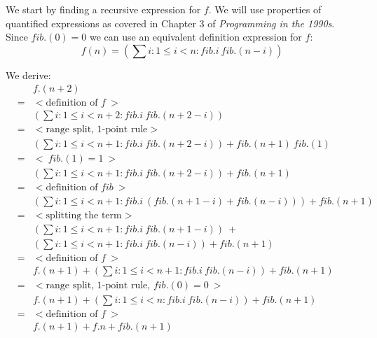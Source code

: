 We start by finding a recursive expression for $f$. We will use properties of quantified expressions as covered in Chapter 3 of \textit{Programming in the 1990s}\cite{Cohen90}. Since $ \mathit{fib}.(0) = 0$ we can use an equivalent definition expression for $f$:
\[
f(n) = (\sum i: 1 \leq i < n: \mathit{fib}.i\  \mathit{fib}.(n - i))
\]

We derive:
\[
\begin{array}{lcl}
		&&f.(n + 2) \\
	      &=& { < \text{definition of  } f\ >} \\      
                  && (\sum i: 1 \leq i < n + 2: \mathit{fib}.i\  \mathit{fib}.(n + 2 - i))\\
                &=& { < \text{range split, 1-point rule} >} \\
                  &&  (\sum i: 1 \leq i < n + 1: \mathit{fib}.i\  \mathit{fib}.(n + 2 - i)) + \mathit{fib}.(n+ 1)\  \mathit{fib}.(1) \\
                &=& { <\  \mathit{fib}.(1) = 1\  >} \\ 
                   && (\sum i: 1 \leq i < n + 1: \mathit{fib}.i\  \mathit{fib}.(n + 2 - i)) + \mathit{fib}.(n+ 1)\\
	       &=& { < \text{definition of } \mathit{fib}\ >} \\
	       	&& (\sum i: 1 \leq i < n + 1: \mathit{fib}.i\  (\mathit{fib}.(n + 1 - i) + \mathit{fib}.(n - i))) + \mathit{fib}.(n+ 1)\\
	      &=& { < \text{splitting the term} >} \\
	       	&& (\sum i: 1 \leq i < n + 1: \mathit{fib}.i\  \mathit{fib}.(n + 1 - i))\ + \\
		&& (\sum i: 1 \leq i < n + 1: \mathit{fib}.i\  \mathit{fib}.(n - i)) + \mathit{fib}.(n+ 1)\\	      &=& { < \text{definition of } f\ >} \\
	       	&& f.(n + 1) +  (\sum i: 1 \leq i < n + 1: \mathit{fib}.i\  \mathit{fib}.(n - i)) + \mathit{fib}.(n+ 1) \\
	      &=& { < \text{range split, 1-point rule, } \mathit{fib}.(0) = 0\  >} \\
                  && f.(n + 1) +  (\sum i: 1 \leq i < n: \mathit{fib}.i\  \mathit{fib}.(n - i)) + \mathit{fib}.(n+ 1) \\
               &=& { < \text{definition of } f\ >} \\
	       	&& f.(n + 1) +  f.n + \mathit{fib}.(n+ 1)   
   \end{array}
\]

